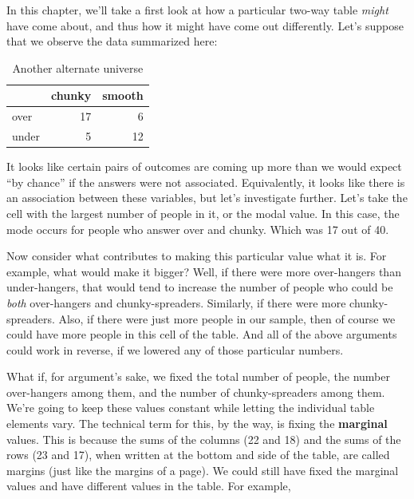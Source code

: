 \documentclass[openany]{book}
\begin{document}
In this chapter, we'll take a first look at how a particular two-way table \emph{might} have come about, and thus how it might have come out differently. Let's suppose that we observe the data summarized here:

\begin{table}[!h]

\caption{\label{tab:indep-sim}Another alternate universe}
\centering
\begin{tabular}[t]{lrr}
\toprule
  & chunky & smooth\\
\midrule
over & 17 & 6\\
under & 5 & 12\\
\bottomrule
\end{tabular}
\end{table}

It looks like certain pairs of outcomes are coming up more than we would expect ``by chance'' if the answers were not associated. Equivalently, it looks like there is an association between these variables, but let's investigate further. Let's take the cell with the largest number of people in it, or the modal value. In this case, the mode occurs for people who answer over and chunky. Which was 17 out of 40.

Now consider what contributes to making this particular value what it is. For example, what would make it bigger? Well, if there were more over-hangers than under-hangers, that would tend to increase the number of people who could be \emph{both} over-hangers and chunky-spreaders. Similarly, if there were more chunky-spreaders. Also, if there were just more people in our sample, then of course we could have more people in this cell of the table. And all of the above arguments could work in reverse, if we lowered any of those particular numbers.

What if, for argument's sake, we fixed the total number of people, the number over-hangers among them, and the number of chunky-spreaders among them. We're going to keep these values constant while letting the individual table elements vary. The technical term for this, by the way, is fixing the \textbf{marginal} values. This is because the sums of the columns (22 and 18) and the sums of the rows (23 and 17), when written at the bottom and side of the table, are called margins (just like the margins of a page). We could still have fixed the marginal values and have different values in the table. For example,
\end{document}
